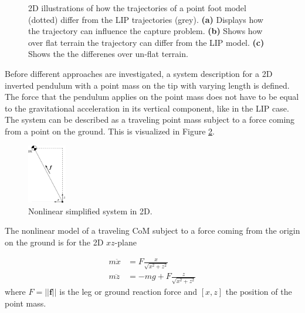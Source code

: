 \begin{figure}[h]
\label{fig:varheight}
\caption{\ac{2D} illustrations of how the trajectories of a point foot model (dotted) differ from the \ac{LIP} trajectories (grey). \textbf{(a)} Displays how the trajectory can influence the capture problem. \textbf{(b)} Shows how over flat terrain the trajectory can differ from the \ac{LIP} model. \textbf{(c)} Shows the the differenes over un-flat terrain.}
\end{figure}

Before different approaches are investigated, a system description for a \ac{2D} inverted pendulum with a point mass on the tip with varying length is defined. The force that the pendulum applies on the point mass does not have to be equal to the gravitational acceleration in its vertical component, like in the \ac{LIP} case. The system can be described as a traveling point mass subject to a force coming from a point on the ground. This is visualized in Figure \ref{fig:2dnonlin}.
\begin{figure}[h]
\centering
\includegraphics[width=0.15\textwidth]{STYLESTUFF/2Dnonlin.png}
\caption{Nonlinear simplified system in \ac{2D}.}
\label{fig:2dnonlin}
\end{figure} 

The nonlinear model of a traveling \ac{CoM} subject to a force coming from the origin on the ground is for the \ac{2D} $xz$-plane

\begin{align}
m\ddot{x} &= F \frac{x}{\sqrt{x^2+z^2}}\label{eq:nonlindyn1}\\
m\ddot{z} &= -mg+F \frac{z}{\sqrt{x^2+z^2}} \label{eq:nonlindyn2}
\end{align}
where $F=||\boldsymbol{f}||$ is the leg or ground reaction force and $[x,z]$ the position of the point mass.


